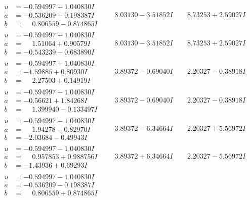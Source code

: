 \documentclass[1p]{elsarticle_modified}
\theoremstyle{definition}
\begin{document}
$$\begin{array}{c|c|c}
\begin{aligned}
u &= -0.594997 + 1.040830 I \\
a &= -0.536209 + 0.198387 I \\
b &= \phantom{-}0.806559 - 0.874865 I\end{aligned}
 & \phantom{-}8.03130 - 3.51852 I & \phantom{-}8.73253 + 2.59027 I \\ \hline\begin{aligned}
u &= -0.594997 + 1.040830 I \\
a &= \phantom{-}1.51064 + 0.90579 I \\
b &= -0.543239 - 0.683890 I\end{aligned}
 & \phantom{-}8.03130 - 3.51852 I & \phantom{-}8.73253 + 2.59027 I \\ \hline\begin{aligned}
u &= -0.594997 + 1.040830 I \\
a &= -1.59885 + 0.80930 I \\
b &= \phantom{-}2.27503 + 0.14919 I\end{aligned}
 & \phantom{-}3.89372 - 0.69040 I & \phantom{-}2.20327 - 0.38918 I \\ \hline\begin{aligned}
u &= -0.594997 + 1.040830 I \\
a &= -0.56621 + 1.84268 I \\
b &= \phantom{-}1.399940 - 0.133497 I\end{aligned}
 & \phantom{-}3.89372 - 0.69040 I & \phantom{-}2.20327 - 0.38918 I \\ \hline\begin{aligned}
u &= -0.594997 + 1.040830 I \\
a &= \phantom{-}1.94278 - 0.82970 I \\
b &= -2.03684 - 0.49943 I\end{aligned}
 & \phantom{-}3.89372 - 6.34664 I & \phantom{-}2.20327 + 5.56972 I \\ \hline\begin{aligned}
u &= -0.594997 - 1.040830 I \\
a &= \phantom{-}0.957853 + 0.988756 I \\
b &= -1.43936 + 0.69293 I\end{aligned}
 & \phantom{-}3.89372 + 6.34664 I & \phantom{-}2.20327 - 5.56972 I \\ \hline\begin{aligned}
u &= -0.594997 - 1.040830 I \\
a &= -0.536209 - 0.198387 I \\
b &= \phantom{-}0.806559 + 0.874865 I\end{aligned}

\end{array}$$
\end{document}
